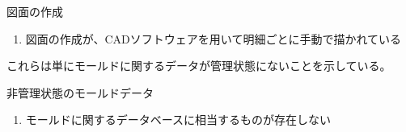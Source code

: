 \begin{Issues}{図面の作成}
\begin{enumerate}
\item 図面の作成が、CADソフトウェアを用いて明細ごとに手動で描かれている
\end{enumerate}
\end{Issues}
これらは単にモールドに関するデータが管理状態にないことを示している。
\begin{Issues}{非管理状態のモールドデータ}
\begin{enumerate}
\item モールドに関するデータベースに相当するものが存在しない
\end{enumerate}
\end{Issues}





